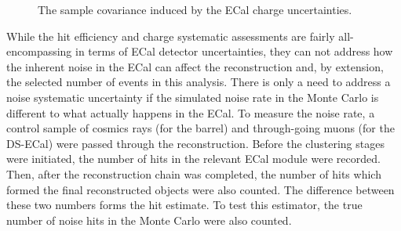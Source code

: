 \begin{figure}%
  \centering
  \caption{The sample covariance induced by the ECal charge uncertainties.}
  \label{fig:ECalChargeCovarianceMatrices}
\end{figure}
\newline
\newline
While the hit efficiency and charge systematic assessments are fairly all-encompassing in terms of ECal detector uncertainties, they can not address how the inherent noise in the ECal can affect the reconstruction and, by extension, the selected number of events in this analysis.  There is only a need to address a noise systematic uncertainty if the simulated noise rate in the Monte Carlo is different to what actually happens in the ECal.  To measure the noise rate, a control sample  of cosmics rays (for the barrel) and through-going muons (for the DS-ECal) were passed through the reconstruction.  Before the clustering stages were initiated, the number of hits in the relevant ECal module were recorded.  Then, after the reconstruction chain was completed, the number of hits which formed the final reconstructed objects were also counted.  The difference between these two numbers forms the hit estimate.  To test this estimator, the true number of noise hits in the Monte Carlo were also counted.
